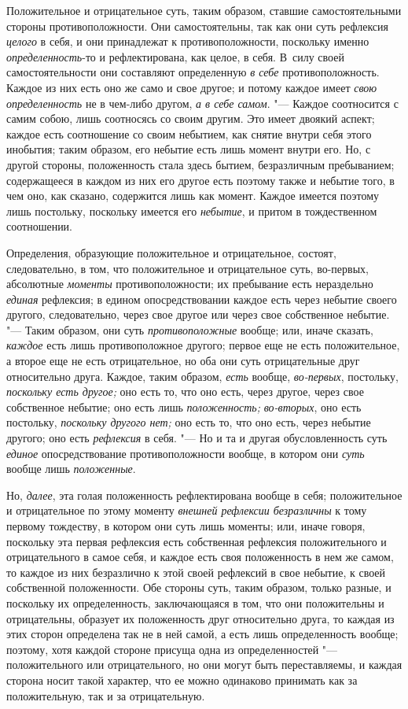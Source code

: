 Положительное и отрицательное суть, таким образом, ставшие самостоятельными
стороны противоположности. Они самостоятельны, так как они суть рефлексия
{\em целого} в себя, и они принадлежат к
противоположности, поскольку именно
{\em определенность}-то и рефлектирована, как целое,
в себя. В~силу своей самостоятельности они составляют определенную
{\em в себе} противоположность. Каждое из них есть оно
же само и свое другое; и потому каждое имеет {\em свою
определенность} не в чем-либо другом, {\em а в себе
самом}. "--- Каждое соотносится с самим собою, лишь соотносясь со своим
другим. Это имеет двоякий аспект; каждое есть соотношение со своим
небытием, как снятие внутри себя этого инобытия; таким образом, его небытие
есть лишь момент внутри его. Но, с другой стороны, положенность стала здесь
бытием, безразличным пребыванием; содержащееся в каждом из них его другое
есть поэтому также и небытие того, в чем оно, как сказано, содержится лишь
как момент. Каждое имеется поэтому лишь постольку, поскольку имеется его
{\em небытие}, и притом в тождественном соотношении.

Определения, образующие положительное и отрицательное, состоят,
следовательно, в том, что положительное и отрицательное суть, во-первых,
абсолютные {\em моменты} противоположности; их
пребывание есть нераздельно {\em единая} рефлексия; в
едином опосредствовании каждое есть через небытие своего другого,
следовательно, через свое другое или через свое собственное небытие. "---
Таким образом, они суть {\em противоположные} вообще;
или, иначе сказать, {\em каждое} есть лишь
противоположное другого; первое еще не есть положительное, а второе еще не
есть отрицательное, но оба они суть отрицательные друг относительно друга.
Каждое, таким образом, {\em есть} вообще,
{\em во-первых}, постольку,
{\em поскольку есть другое;} оно есть то, что оно есть,
через другое, через свое собственное небытие; оно есть лишь
{\em положенность;} {\em во-вторых}, оно есть постольку,
{\em поскольку другого нет;} оно есть то, что оно есть,
через небытие другого; оно есть {\em рефлексия} в себя.
"--- Но и та и другая обусловленность суть {\em единое}
опосредствование противоположности вообще, в котором они
{\em суть} вообще лишь {\em положенные}.

Но, {\em далее}, эта голая положенность рефлектирована
вообще в себя; положительное и отрицательное по этому моменту
{\em внешней рефлексии безразличны} к тому первому
тождеству, в котором они суть лишь моменты; или, иначе говоря, поскольку
эта первая рефлексия есть собственная рефлексия положительного и
отрицательного в самое себя, и каждое есть своя положенность в нем же
самом, то каждое из них безразлично к этой своей рефлексий в свое небытие,
к своей собственной положенности. Обе стороны суть, таким образом, только
разные, и поскольку их определенность, заключающаяся в том, что они
положительны и отрицательны, образует их положенность друг относительно
друга, то каждая из этих сторон определена так не в ней самой, а есть лишь
определенность вообще; поэтому, хотя каждой стороне присуща одна из
определенностей "--- положительного или отрицательного, но они могут быть
переставляемы, и каждая сторона носит такой характер, что ее можно
одинаково принимать как за положительную, так и за отрицательную.

